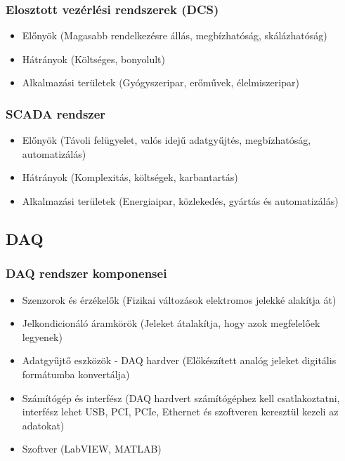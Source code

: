 \subsubsection{Elosztott vezérlési rendszerek (DCS)}
\begin{itemize}
    \item Előnyök (Magasabb rendelkezésre állás, megbízhatóság, skálázhatóság)
    \item Hátrányok (Költséges, bonyolult)
    \item Alkalmazási területek (Gyógyszeripar, erőművek, élelmiszeripar)
\end{itemize}

\subsubsection{SCADA rendszer}
\begin{itemize}
    \item Előnyök (Távoli felügyelet, valós idejű adatgyűjtés, megbízhatóság, automatizálás)
    \item Hátrányok (Komplexitás, költségek, karbantartás)
    \item Alkalmazási területek (Energiaipar, közlekedés, gyártás és automatizálás)
\end{itemize}

\clearpage
\subsection{DAQ}
\subsubsection{DAQ rendszer komponensei}
\begin{itemize}
    \item Szenzorok és érzékelők (Fizikai változások elektromos jelekké alakítja át)
    \item Jelkondicionáló áramkörök (Jeleket átalakítja, hogy azok megfelelőek legyenek)
    \item Adatgyűjtő eszközök - DAQ hardver (Előkészített analóg jeleket digitális formátumba konvertálja)
    \item Számítógép és interfész (DAQ hardvert számítógéphez kell csatlakoztatni, interfész lehet USB, PCI, PCIe, Ethernet és szoftveren keresztül kezeli az adatokat)
    \item Szoftver (LabVIEW, MATLAB)
\end{itemize}

